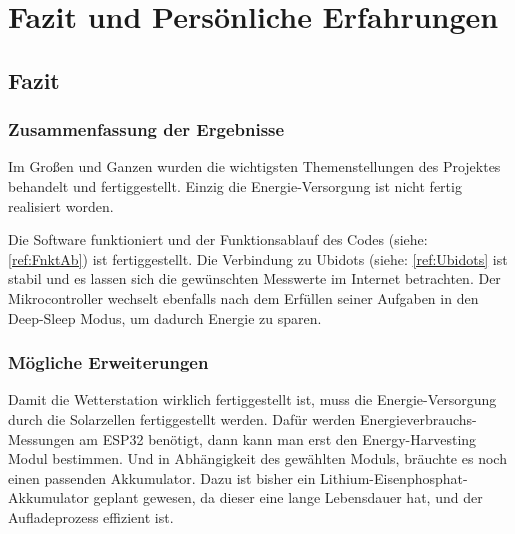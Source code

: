 



\chapter{Fazit und Persönliche Erfahrungen}


\section{Fazit}

\subsection{Zusammenfassung der Ergebnisse}
    Im Großen und Ganzen wurden die wichtigsten Themenstellungen des Projektes behandelt und fertiggestellt. Einzig die Energie-Versorgung ist nicht fertig realisiert worden.
    
    Die Software funktioniert und der Funktionsablauf des Codes (siehe: \ref{ref:FnktAb}) ist fertiggestellt. Die Verbindung zu Ubidots (siehe: \ref{ref:Ubidots} ist stabil und es lassen sich die gewünschten Messwerte im Internet betrachten. Der Mikrocontroller wechselt ebenfalls nach dem Erfüllen seiner Aufgaben in den Deep-Sleep Modus, um dadurch Energie zu sparen.  

\subsection{Mögliche Erweiterungen}
    Damit die Wetterstation wirklich fertiggestellt ist, muss die Energie-Versorgung durch die Solarzellen fertiggestellt werden. Dafür werden Energieverbrauchs-Messungen am ESP32 benötigt, dann kann man erst den Energy-Harvesting Modul bestimmen. Und in Abhängigkeit des gewählten Moduls, bräuchte es noch einen passenden Akkumulator. Dazu ist bisher ein Lithium-Eisenphosphat-Akkumulator geplant gewesen, da dieser eine lange Lebensdauer hat, und der Aufladeprozess effizient ist.
    
